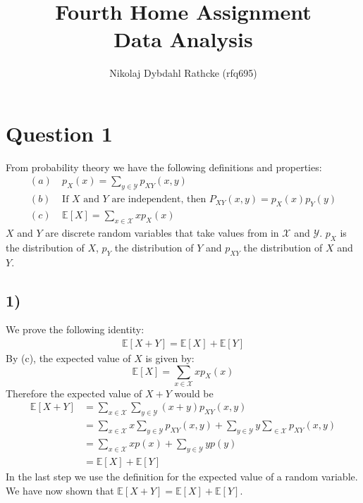 \documentclass[a4paper]{article}
\author{Nikolaj Dybdahl Rathcke (rfq695)}
\title{Fourth Home Assignment \\ Data Analysis}
\begin{document}
\maketitle
\section*{Question 1}
From probability theory we have the following definitions and properties:
\begin{align*}
(a) &\ p_X(x)=\sum_{y\in \mathcal{Y}}p_{XY}(x,y) \\
(b) &\ \mbox{If $X$ and $Y$ are independent, then $P_{XY}(x,y)=p_X(x)p_Y(y)$} \\
(c) &\ \mathbb{E}[X]=\sum_{x\in \mathcal{X}}xp_X(x)
\end{align*}
$X$ and $Y$ are discrete random variables that take values from in $\mathcal{X}$ and $\mathcal{Y}$. $p_X$ is the distribution of $X$, $p_Y$ the distribution of $Y$ and $p_{XY}$ the distribution of $X$ and $Y$.

\subsection*{1)}
We prove the following identity:
\begin{align*}
\mathbb{E}[X+Y]=\mathbb{E}[X]+\mathbb{E}[Y]
\end{align*}
By (c), the expected value of $X$ is given by:
$$\mathbb{E}[X]=\sum_{x\in \mathcal{X}}xp_X(x)$$
Therefore the expected value of $X+Y$ would be
\begin{align*}
\mathbb{E}[X+Y] &=\sum_{x\in \mathcal{X}}\sum_{y\in \mathcal{Y}} (x+y)p_{XY}(x,y) \\
                &= \sum_{x\in \mathcal{X}}x\sum_{y\in \mathcal{Y}} p_{XY}(x,y)+ \sum_{y\in \mathcal{Y}}y\sum_{\in \mathcal{X}} p_{XY}(x,y) \\
                &= \sum_{x\in \mathcal{X}}xp(x)+\sum_{y\in \mathcal{Y}}yp(y) \\ 
                &= \mathbb{E}[X]+\mathbb{E}[Y]
\end{align*}
In the last step we use the definition for the expected value of a random variable. We have now shown that $\mathbb{E}[X+Y]=\mathbb{E}[X]+\mathbb{E}[Y]$.
\end{document}
